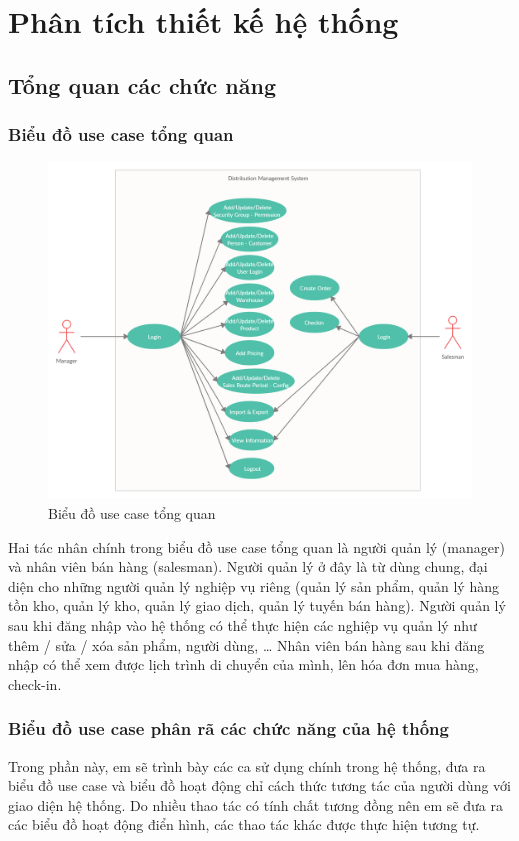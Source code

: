 \chapter{Phân tích thiết kế hệ thống}
\section{Tổng quan các chức năng}
\subsection{Biểu đồ use case tổng quan}
\begin{figure}[H]
    \centering
    \includegraphics[width=12cm]{images/use-case/use-case-summary.jpg}
    \caption{Biểu đồ use case tổng quan}
\end{figure}

Hai tác nhân chính trong biểu đồ use case tổng quan
là người quản lý (manager) và nhân viên bán hàng (salesman).
Người quản lý ở đây là từ dùng chung, đại diện cho những người
quản lý nghiệp vụ riêng (quản lý sản phẩm, quản lý hàng tồn kho,
quản lý kho, quản lý giao dịch, quản lý tuyến bán hàng).
Người quản lý sau khi đăng nhập vào hệ thống có thể thực hiện
các nghiệp vụ quản lý như thêm / sửa / xóa sản phẩm, người dùng, …
Nhân viên bán hàng sau khi đăng nhập có thể xem được lịch
trình di chuyển của mình, lên hóa đơn mua hàng, check-in.

\subsection{Biểu đồ use case phân rã các chức năng của hệ thống}
Trong phần này, em sẽ trình bày các ca sử dụng chính trong hệ
thống, đưa ra biểu đồ use case và biểu đồ hoạt động chỉ cách
thức tương tác của người dùng với giao diện hệ thống. Do nhiều thao
tác có tính chất tương đồng nên em sẽ đưa ra các biểu
đồ hoạt động điển hình, các thao tác khác được thực hiện tương tự.

